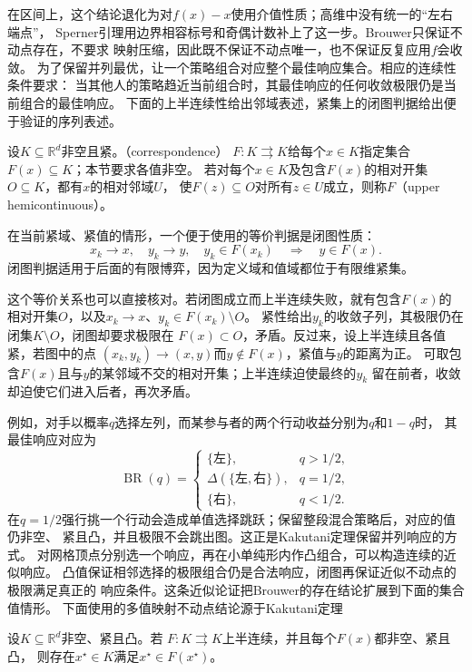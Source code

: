 在区间上，这个结论退化为对\(f(x)-x\)使用介值性质；高维中没有统一的“左右端点”，
Sperner引理用边界相容标号和奇偶计数补上了这一步。Brouwer只保证不动点存在，不要求
映射压缩，因此既不保证不动点唯一，也不保证反复应用\(f\)会收敛。
为了保留并列最优，让一个策略组合对应整个最佳响应集合。相应的连续性条件要求：
当其他人的策略趋近当前组合时，其最佳响应的任何收敛极限仍是当前组合的最佳响应。
下面的上半连续性给出邻域表述，紧集上的闭图判据给出便于验证的序列表述。
\begin{definition}[集合值映射与上半连续性]
\label{def:game-upper-hemicontinuous-correspondence}
设$K\subseteq\mathbb R^d$非空且紧。（correspondence）
\(F:K\rightrightarrows K\)给每个$x\in K$指定集合$F(x)\subseteq K$；本节要求各值非空。
若对每个$x\in K$及包含$F(x)$的相对开集$O\subseteq K$，都有$x$的相对邻域$U$，
使$F(z)\subseteq O$对所有$z\in U$成立，则称$F$（upper hemicontinuous）。
\end{definition}
在当前紧域、紧值的情形，一个便于使用的等价判据是闭图性质：
\[
  x_k\to x,\quad y_k\to y,\quad y_k\in F(x_k)
  \quad\Longrightarrow\quad
  y\in F(x).
\]
闭图判据适用于后面的有限博弈，因为定义域和值域都位于有限维紧集。

这个等价关系也可以直接核对。若闭图成立而上半连续失败，就有包含\(F(x)\)的
相对开集\(O\)，以及\(x_k\to x\)、\(y_k\in F(x_k)\setminus O\)。
紧性给出\(y_k\)的收敛子列，其极限仍在闭集\(K\setminus O\)，闭图却要求极限在
\(F(x)\subset O\)，矛盾。反过来，设上半连续且各值紧，若图中的点
\((x_k,y_k)\to(x,y)\)而\(y\notin F(x)\)，紧值与\(y\)的距离为正。
可取包含\(F(x)\)且与\(y\)的某邻域不交的相对开集；上半连续迫使最终的\(y_k\)
留在前者，收敛却迫使它们进入后者，再次矛盾。

例如，对手以概率\(q\)选择左列，而某参与者的两个行动收益分别为\(q\)和\(1-q\)时，
其最佳响应对应为
\[
  \operatorname{BR}(q)
  =
  \begin{cases}
    \{\text{左}\},&q>1/2,\\
    \Delta(\{\text{左},\text{右}\}),&q=1/2,\\
    \{\text{右}\},&q<1/2.
  \end{cases}
\]
在\(q=1/2\)强行挑一个行动会造成单值选择跳跃；保留整段混合策略后，对应的值仍非空、
紧且凸，并且极限不会跳出图。这正是Kakutani定理保留并列响应的方式。
对网格顶点分别选一个响应，再在小单纯形内作凸组合，可以构造连续的近似响应。
凸值保证相邻选择的极限组合仍是合法响应，闭图再保证近似不动点的极限满足真正的
响应条件。这条近似论证把Brouwer的存在结论扩展到下面的集合值情形。
下面使用的多值映射不动点结论源于Kakutani定理
\begin{theorem}[Kakutani不动点定理]
\label{thm:game-kakutani}
设\(K\subseteq\mathbb{R}^d\)非空、紧且凸。若
\(F:K\rightrightarrows K\)上半连续，并且每个\(F(x)\)都非空、紧且凸，
则存在\(x^\star\in K\)满足\(x^\star\in F(x^\star)\)。
\end{theorem}


